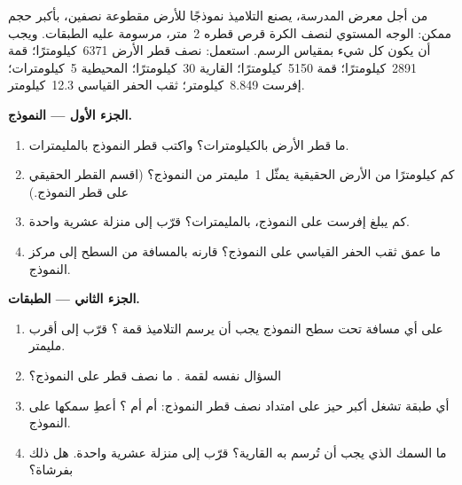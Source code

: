 \begin{problem}
\label{pb:g6:inside-the-earth:1}
من أجل معرض المدرسة، يصنع التلاميذ نموذجًا للأرض مقطوعة نصفين، بأكبر
حجم ممكن: الوجه المستوي لنصف الكرة قرص قطره 2~متر،
مرسومة عليه الطبقات. ويجب أن يكون كل شيء بمقياس الرسم. استعمل: نصف قطر
الأرض 6371~كيلومترًا؛ قمة  2891~كيلومترًا؛ قمة 
5150~كيلومترًا؛  القارية 30~كيلومترًا؛  المحيطية 5~كيلومترات؛ إفرست 8.849~كيلومتر؛
ثقب الحفر القياسي 12.3~كيلومتر.

\medskip
\noindent\textbf{الجزء الأول --- النموذج.}
\begin{enumerate}
  \item ما قطر الأرض بالكيلومترات؟ واكتب
        قطر النموذج بالمليمترات.
  \item كم كيلومترًا من الأرض الحقيقية يمثّل 1~مليمتر من
        النموذج؟ (اقسم القطر الحقيقي على قطر النموذج.)
  \item كم يبلغ  إفرست على النموذج، بالمليمترات؟ قرّب إلى منزلة
        عشرية واحدة.
  \item ما عمق ثقب الحفر القياسي على النموذج؟ قارنه
        بالمسافة من السطح إلى مركز النموذج.
\end{enumerate}

\medskip
\noindent\textbf{الجزء الثاني --- الطبقات.}
\begin{enumerate}[resume]
  \item على أي مسافة تحت سطح النموذج يجب أن يرسم التلاميذ
        قمة ؟ قرّب إلى أقرب مليمتر.
  \item السؤال نفسه لقمة . ما نصف قطر
         على النموذج؟
  \item أي طبقة تشغل أكبر حيز على امتداد نصف قطر النموذج:
         أم  أم ؟ أعطِ سمكها على
        النموذج.
  \item ما السمك الذي يجب أن تُرسم به  القارية؟ قرّب إلى منزلة
        عشرية واحدة. هل ذلك  بفرشاة؟
\end{enumerate}


\end{problem}
